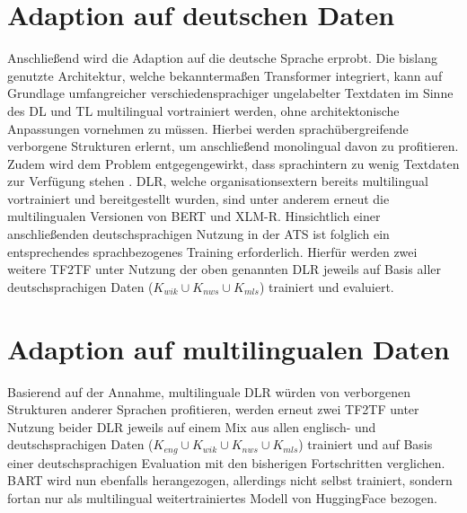 \section{Adaption auf deutschen Daten}
\noindent
Anschließend wird die Adaption auf die deutsche Sprache erprobt. Die bislang genutzte Architektur, welche bekanntermaßen Transformer integriert, kann auf Grundlage umfangreicher verschiedensprachiger ungelabelter Textdaten im Sinne des \ac{DL} und \ac{TL} multilingual vortrainiert werden, ohne architektonische Anpassungen vornehmen zu müssen. Hierbei werden sprachübergreifende verborgene Strukturen erlernt, um anschließend monolingual davon zu profitieren. Zudem wird dem Problem entgegengewirkt, dass sprachintern zu wenig Textdaten zur Verfügung stehen \cite{MOB20}. \ac{DLR}, welche organisationsextern bereits multilingual vortrainiert und bereitgestellt wurden, sind unter anderem erneut die multilingualen Versionen von \ac{BERT} und \ac{XLM-R}. Hinsichtlich einer anschließenden deutschsprachigen Nutzung in der \ac{ATS} ist folglich ein entsprechendes sprachbezogenes Training erforderlich. Hierfür werden zwei weitere \ac{TF2TF} unter Nutzung der oben genannten \ac{DLR} jeweils auf Basis aller deutschsprachigen Daten ($K_{wik} \cup K_{nws} \cup K_{mls}$) trainiert und evaluiert.


\section{Adaption auf multilingualen Daten}
\noindent
Basierend auf der Annahme, multilinguale \ac{DLR} würden von verborgenen Strukturen anderer Sprachen profitieren, werden erneut zwei \ac{TF2TF} unter Nutzung beider \ac{DLR} jeweils auf einem Mix aus allen englisch- und deutschsprachigen Daten ($K_{eng} \cup K_{wik} \cup K_{nws} \cup K_{mls}$) trainiert und auf Basis einer deutschsprachigen Evaluation mit den bisherigen Fortschritten verglichen. \ac{BART} wird nun ebenfalls herangezogen, allerdings nicht selbst trainiert, sondern fortan nur als multilingual weitertrainiertes Modell von HuggingFace bezogen.
